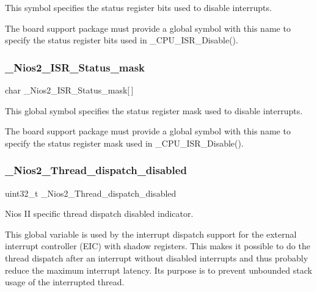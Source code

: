 This symbol specifies the status register bits used to disable interrupts. 

The board support package must provide a global symbol with this name to specify the status register bits used in \+\_\+\+C\+P\+U\+\_\+\+I\+S\+R\+\_\+\+Disable(). \mbox{\label{nios2-utility_8h_ad44d03951a88738afe8fd6081ad2c6e9}} 
\subsubsection{\texorpdfstring{\_Nios2\_ISR\_Status\_mask}{\_Nios2\_ISR\_Status\_mask}}
{\footnotesize\ttfamily char \+\_\+\+Nios2\+\_\+\+I\+S\+R\+\_\+\+Status\+\_\+mask\mbox{[}$\,$\mbox{]}}



This global symbol specifies the status register mask used to disable interrupts. 

The board support package must provide a global symbol with this name to specify the status register mask used in \+\_\+\+C\+P\+U\+\_\+\+I\+S\+R\+\_\+\+Disable(). \mbox{\label{nios2-utility_8h_af065794b1f232ce93bb2caee956c4e69}} 
\subsubsection{\texorpdfstring{\_Nios2\_Thread\_dispatch\_disabled}{\_Nios2\_Thread\_dispatch\_disabled}}
{\footnotesize\ttfamily uint32\+\_\+t \+\_\+\+Nios2\+\_\+\+Thread\+\_\+dispatch\+\_\+disabled}



Nios II specific thread dispatch disabled indicator. 

This global variable is used by the interrupt dispatch support for the external interrupt controller (E\+IC) with shadow registers. This makes it possible to do the thread dispatch after an interrupt without disabled interrupts and thus probably reduce the maximum interrupt latency. Its purpose is to prevent unbounded stack usage of the interrupted thread. 